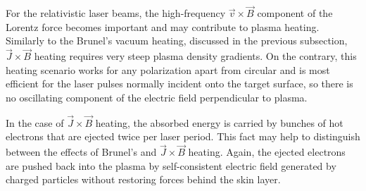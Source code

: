 For the relativistic laser beams, the high-frequency $ \vec{v} \times \vec{B} $ component of the Lorentz force becomes important and may contribute to plasma heating. Similarly to the Brunel's vacuum heating, discussed in the previous subsection, $ \vec{J} \times \vec{B} $ heating requires very steep plasma density gradients. On the contrary, this heating scenario works for any polarization apart from circular and is most efficient for the laser pulses normally incident onto the target surface, so there is no oscillating component of the electric field perpendicular to plasma.

In the case of $ \vec{J} \times \vec{B} $ heating, the absorbed energy is carried by bunches of hot electrons that are ejected twice per laser period. This fact may help to distinguish between the effects of Brunel's and $ \vec{J} \times \vec{B} $ heating. Again, the ejected electrons are pushed back into the plasma by self-consistent electric field generated by charged particles without restoring forces behind the skin layer.